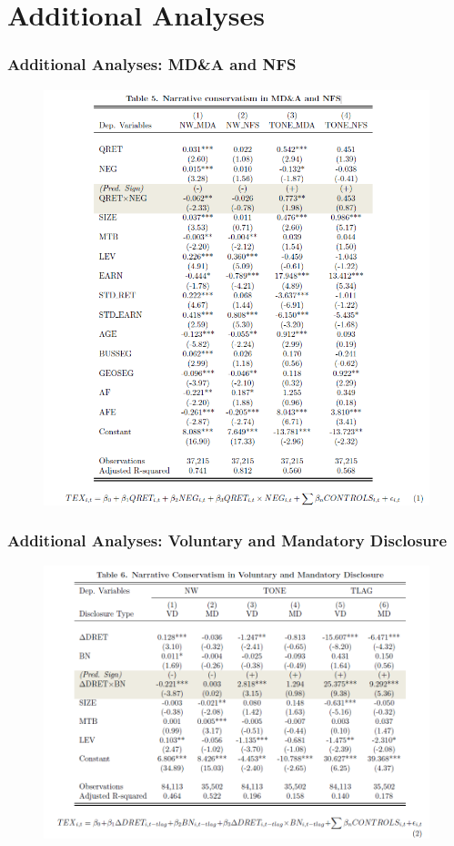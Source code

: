 \documentclass{beamer}
\begin{document}
\section{Additional Analyses}
\begin{frame}
\frametitle{Additional Analyses: MD\&A and NFS}
	\begin{figure}[h]
	\centering
	\includegraphics[width=0.58\linewidth]{tab5}
	\label{tab5}
	\end{figure}
\end{frame}
\begin{frame}
\frametitle{Additional Analyses: Voluntary and Mandatory Disclosure}
	\begin{figure}[h]
	\centering
	\includegraphics[width=0.7\linewidth]{tab6}
	\label{tab6}
	\end{figure}
	
\end{frame}
\end{document}
